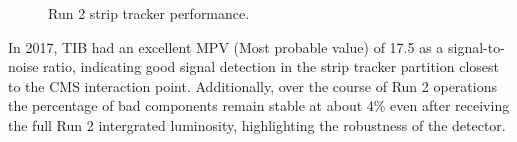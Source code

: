 \begin{figure}[H]%
    \setcounter{subfigure}{0} %
    \centering
    \qquad
    \caption{Run 2 strip tracker performance.} \label{fig:Run2_StripTracker}
\end{figure}  

In 2017, TIB had an excellent MPV (Most probable value) of 17.5 as a signal-to-noise ratio, indicating good signal detection in the strip tracker partition closest to the CMS interaction point. Additionally, over the course of Run 2 operations the percentage of bad components remain stable at about 4\% even after receiving the full Run 2 intergrated luminosity, highlighting the robustness of the detector. 